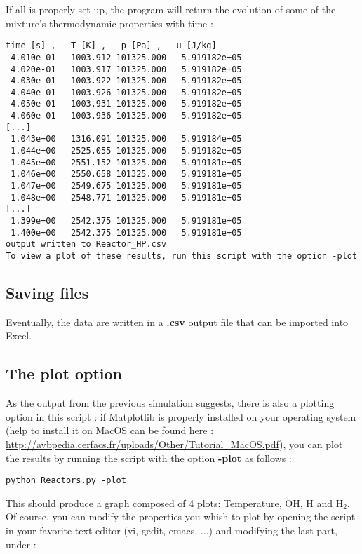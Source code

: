 \documentclass[a4paper,11pt]{article}
\begin{document}
If all is properly set up, the program will return the evolution of some of the mixture's thermodynamic properties with time : 

\begin{verbatim}
time [s] ,   T [K] ,   p [Pa] ,   u [J/kg]
 4.010e-01   1003.912 101325.000   5.919182e+05
 4.020e-01   1003.917 101325.000   5.919182e+05
 4.030e-01   1003.922 101325.000   5.919182e+05
 4.040e-01   1003.926 101325.000   5.919182e+05
 4.050e-01   1003.931 101325.000   5.919182e+05
 4.060e-01   1003.936 101325.000   5.919182e+05
[...]
 1.043e+00   1316.091 101325.000   5.919184e+05
 1.044e+00   2525.055 101325.000   5.919182e+05
 1.045e+00   2551.152 101325.000   5.919181e+05
 1.046e+00   2550.658 101325.000   5.919181e+05
 1.047e+00   2549.675 101325.000   5.919181e+05
 1.048e+00   2548.771 101325.000   5.919181e+05
[...]
 1.399e+00   2542.375 101325.000   5.919181e+05
 1.400e+00   2542.375 101325.000   5.919181e+05
output written to Reactor_HP.csv
To view a plot of these results, run this script with the option -plot
\end{verbatim}
\bigskip

\subsection{Saving files}
Eventually, the data are written in a \textbf{.csv} output file that can be imported into Excel.\\

\newpage

\subsection{The plot option}
As the output from the previous simulation suggests, there is also a plotting option in this script : if Matplotlib is properly installed on your operating system (help to install it on MacOS can be found here : \url{http://avbpedia.cerfacs.fr/uploads/Other/Tutorial_MacOS.pdf}), you can plot the results by running the script with the option \textbf{-plot} as follows : 
\begin{verbatim}
python Reactors.py -plot
\end{verbatim}
\bigskip

This should produce a graph composed of 4 plots: Temperature, OH, H and H$_2$. Of course, you can modify the properties you whish to plot by opening the script in your favorite text editor (vi, gedit, emacs, ...) and modifying the last part, under :
\end{document}

